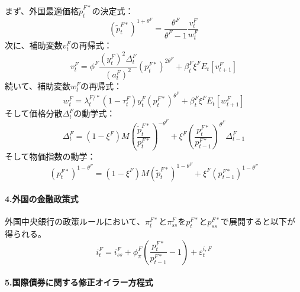 まず、外国最適価格\(\widetilde{p}_t^{F*}\)の決定式：
\begin{equation}
    (\widetilde{p}_t^{F*})^{1+\theta^F}=\frac{\theta^F}{\theta^F-1}\frac{v_t^F}{w_t^F}
    \label{eq:appendix_insulation_effect_core_phillips_opt_p}
\end{equation}
次に、補助変数\(v_t^F\)の再帰式：
\begin{equation}
    v_t^F=\phi^F\frac{(y_t^F)^2\Delta_t^F}{(a_t^F)^2}(p_t^{F*})^{2\theta^F}+\beta_t^F\xi^FE_t[v_{t+1}^F]
    \label{eq:appendix_insulation_effect_core_phillips_v_recursive}
\end{equation}
続いて、補助変数\(w_t^F\)の再帰式：
\begin{equation}
    w_t^F=\lambda_t^{F/*}(1-\tau_t^F)y_t^F(p_t^{F*})^{\theta^F}+\beta_t^F\xi^FE_t[w_{t+1}^F]
    \label{eq:appendix_insulation_effect_core_phillips_w_recursive}
\end{equation}
そして価格分散\(\Delta_t^F\)の動学式：
\begin{equation}
    \Delta_t^F=(1-\xi^F)M\left(\frac{\widetilde{p}_t^{F*}}{p_t^{F*}}\right)^{-\theta^F}+\xi^F\left(\frac{p_t^{F*}}{p_{t-1}^{F*}}\right)^{\theta^F}\Delta_{t-1}^F
    \label{eq:appendix_insulation_effect_core_phillips_delta_dynamics}
\end{equation}
そして物価指数の動学：
\begin{equation}
    (p_t^{F*})^{1-\theta^F}=(1-\xi^F)M(\widetilde{p}_t^{F*})^{1-\theta^F}+\xi^F(p_{t-1}^{F*})^{1-\theta^F}
    \label{eq:appendix_insulation_effect_core_phillips_price_dynamics}
\end{equation}

\paragraph{4.外国の金融政策式}
\label{sec:appendix_insulation_effect_core_policy}

外国中央銀行の政策ルールにおいて、\(\pi_t^{F*}\)と\(\pi_{ss}^F\)を\(p_t^{F*}\)と\(p_{ss}^{F*}\)で展開すると以下が得られる。
\begin{equation}
    i_t^F=i_{ss}^F+\phi_{\pi}^F\left(\frac{p_t^{F*}}{p_{t-1}^{F*}}-1\right)+\varepsilon_t^{i,F}
    \label{eq:appendix_insulation_effect_core_policy_rule}
\end{equation}

\paragraph{5.国際債券に関する修正オイラー方程式}
\label{sec:appendix_insulation_effect_core_modified_uip}

